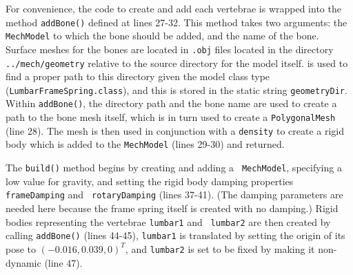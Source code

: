 For convenience, the code to create and add each vertebrae is wrapped
into the method {\tt addBone()} defined at lines 27-32. This method
takes two arguments: the {\tt MechModel} to which the bone should be
added, and the name of the bone. Surface meshes for the bones are
located in {\tt .obj} files located in the directory {\tt
../mech/geometry} relative to the source directory for the model
itself.
is used to find a proper path to this directory given the model class
type ({\tt LumbarFrameSpring.class}), and this is stored in the static
string {\tt geometryDir}. Within {\tt addBone()}, the directory path
and the bone name are used to create a path to the bone mesh itself,
which is in turn used to create a {\tt PolygonalMesh} (line 28). The
mesh is then used in conjunction with a {\tt density} to create a
rigid body which is added to the {\tt MechModel} (lines 29-30) and
returned.

The {\tt build()} method begins by creating and adding a {\tt
MechModel}, specifying a low value for gravity, and setting the rigid
body damping properties {\tt frameDamping} and {\tt
rotaryDamping} (lines 37-41). (The damping parameters are needed
here because the frame spring itself is created with no damping.)
Rigid bodies representing the vertebrae {\tt lumbar1} and {\tt
lumbar2} are then created by calling {\tt addBone()} (lines 44-45),
{\tt lumbar1} is translated by setting the origin of its pose to
$(-0.016, 0.039, 0)^T$, and {\tt lumbar2} is set to be fixed by making
it non-dynamic (line 47).

